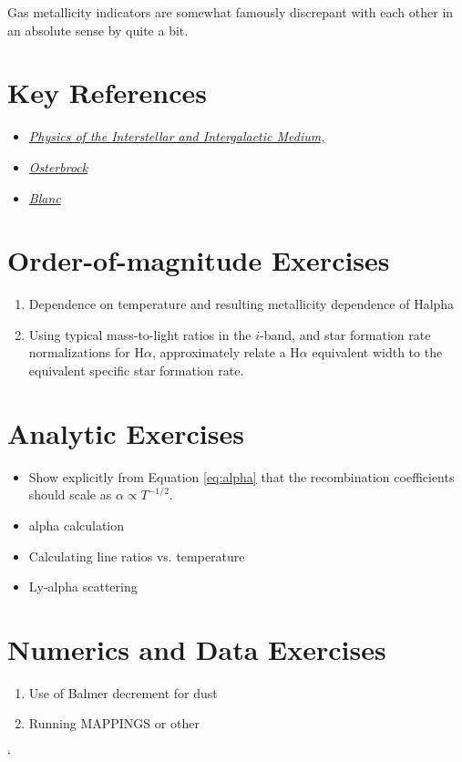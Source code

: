 Gas metallicity indicators are somewhat famously discrepant with each
other in an absolute sense by quite a bit.

\section{Key References}

\begin{itemize}
  \item
    \href{http://}
    {\it Physics of the Interstellar and Intergalactic Medium,
      \citet{draine07a}}
  \item
    \href{http://}
    {\it Osterbrock
      \citet{osterbrock06a}}
  \item
    \href{http://}
    {\it Blanc
      \citet{blanc15a}}
\end{itemize}

\section{Order-of-magnitude Exercises}

\begin{enumerate} 
\item Dependence on temperature and resulting metallicity dependence
  of Halpha 
\item Using typical mass-to-light ratios in the $i$-band, and star
formation rate normalizations for H$\alpha$, approximately relate a
H$\alpha$ equivalent width to the equivalent specific star formation
rate.
\end{enumerate}   

\section{Analytic Exercises}

\begin{itemize}
\item Show explicitly from Equation \ref{eq:alpha} that the
recombination coefficients should scale
as $\alpha\propto T^{-1/2}$.
\item alpha calculation
\item Calculating line ratios vs. temperature
\item Ly-alpha scattering
\end{itemize}

\section{Numerics and Data Exercises}

\begin{enumerate}
\item Use of Balmer decrement for dust
\item Running MAPPINGS or other
\end{enumerate}`


  
